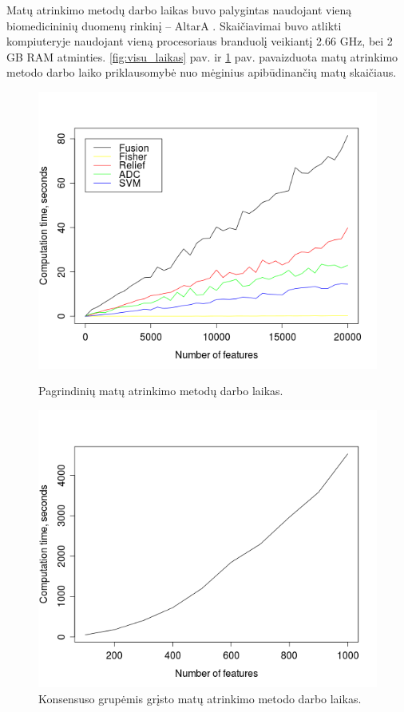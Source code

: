 Matų atrinkimo metodų darbo laikas buvo palygintas naudojant vieną biomedicininių duomenų rinkinį -- AltarA \cite{altara}. Skaičiavimai buvo atlikti kompiuteryje naudojant vieną procesoriaus branduolį veikiantį 2.66 GHz, bei 2 GB RAM atminties. \ref{fig:visu_laikas} pav. ir \ref{fig:cgs_laikas} pav. pavaizduota matų atrinkimo metodo darbo laiko priklausomybė nuo mėginius apibūdinančių matų skaičiaus. 
\begin{figure}[hq]
\begin{minipage}[b]{0.45\linewidth}
\centering
\includegraphics[width=1\textwidth]{images/all_performance.png}
 \caption{Pagrindinių matų atrinkimo metodų darbo laikas.}
 \label{fig:visu_laikas}
\end{minipage}
\hspace{0.2cm}
\begin{minipage}[b]{0.45\linewidth}
\centering
\includegraphics[width=1\textwidth]{images/cgs_performance.png}
 \caption{Konsensuso grupėmis grįsto matų atrinkimo metodo darbo laikas.}
 \label{fig:cgs_laikas}
\end{minipage}
\end{figure}

